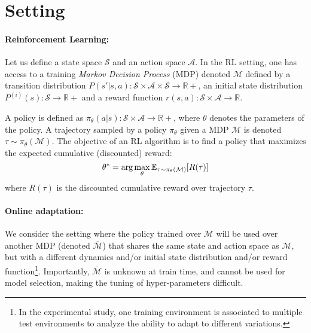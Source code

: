\section{Setting}
\vspace{-0.3cm}

\paragraph{Reinforcement Learning: }
Let us define a state space $\mathcal{S}$ and an action space $\mathcal{A}$. In the RL setting, one has access to a training \textit{Markov Decision Process} (MDP) denoted $\mathcal{M}$ defined by a transition distribution $P(s'|s,a): \mathcal{S} \times \mathcal{A} \times \mathcal{S} \rightarrow \mathbb{R}+$, an initial state distribution $P^{(i)}(s): \mathcal{S} \rightarrow \mathbb{R}+$ and a reward function $r(s,a): \mathcal{S} \times \mathcal{A}\rightarrow \mathbb{R}$. %

A policy is defined as $\pi_\theta(a|s): \mathcal{S} \times \mathcal{A} \rightarrow \mathbb{R}+$, where $\theta$ denotes the parameters of the policy. A trajectory sampled by a policy $\pi_\theta$ given a MDP $\mathcal{M}$ is denoted $\tau \sim \pi_\theta(\mathcal{M})$. The objective of an RL algorithm is to find a policy that maximizes the expected cumulative (discounted) reward:
\begin{equation}
 \theta^* = \arg \max\limits_{\theta} \mathbb{E}_{\tau \sim \pi_\theta(\mathcal{M})}[R(\tau)]  \vspace{-0.15cm} 
\end{equation}
where $R(\tau)$ is the discounted cumulative reward over trajectory $\tau$.

\paragraph{Online adaptation: }

We consider the setting where the policy trained over $\mathcal{M}$ will be used over another MDP (denoted $\bar{\mathcal{M}}$) that shares the same state and action space as $\mathcal{M}$, but with a different dynamics and/or initial state distribution and/or reward function\footnote{In the experimental study, one training environment is associated to multiple test environments to analyze the ability to adapt to different variations.}.  Importantly, $\bar{\mathcal{M}}$ is unknown at train time, and cannot be used for model selection, making the tuning of hyper-parameters  difficult.

